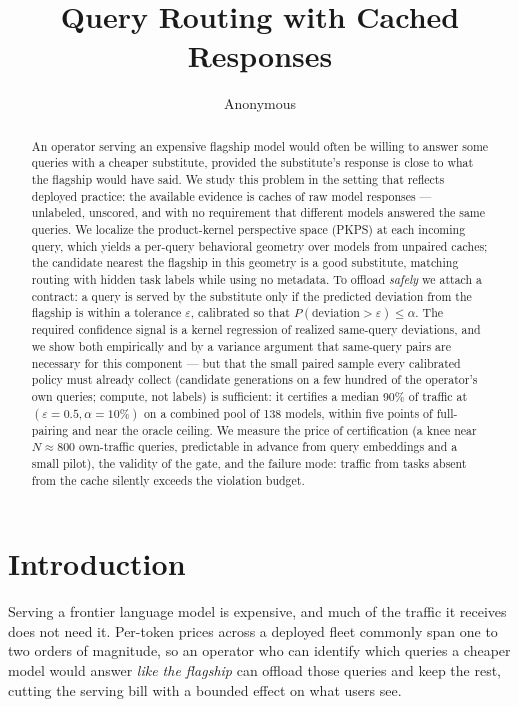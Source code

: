 \documentclass{article}
\title{Query Routing with Cached Responses}
\author{Anonymous}
\newcommand{\PKPS}{PKPS\xspace}
\newcommand{\eps}{\varepsilon}
\begin{document}
\maketitle

\begin{abstract}
An operator serving an expensive flagship model would often be willing to
answer some queries with a cheaper substitute, provided the substitute's
response is close to what the flagship would have said. We study this
problem in the setting that reflects deployed practice: the available
evidence is caches of raw model responses --- unlabeled, unscored, and with
no requirement that different models answered the same queries. We localize
the product-kernel perspective space (\PKPS) at each incoming query, which
yields a per-query behavioral geometry over models from unpaired caches;
the candidate nearest the flagship in this geometry is a good substitute,
matching routing with hidden task labels while using no metadata. To
offload \emph{safely} we attach a contract: a query is served by the
substitute only if the predicted deviation from the flagship is within a
tolerance $\eps$, calibrated so that
$P(\text{deviation} > \eps) \le \alpha$. The required confidence signal is
a kernel regression of realized same-query deviations, and we show both
empirically and by a variance argument that same-query pairs are necessary
for this component --- but that the small paired sample every calibrated
policy must already collect (candidate generations on a few hundred of the
operator's own queries; compute, not labels) is sufficient: it certifies a
median 90\% of traffic at $(\eps{=}0.5, \alpha{=}10\%)$ on a combined pool
of 138 models, within five points of full-pairing and near the oracle
ceiling. We measure the price of certification (a knee near $N \approx 800$
own-traffic queries, predictable in advance from query embeddings and a
small pilot), the validity of the gate, and the failure mode: traffic from
tasks absent from the cache silently exceeds the violation budget.
\end{abstract}

\section{Introduction}

Serving a frontier language model is expensive, and much of the traffic it
receives does not need it. Per-token prices across a deployed fleet
commonly span one to two orders of magnitude, so an operator who can
identify which queries a cheaper model would answer \emph{like the
flagship} can offload those queries and keep the rest, cutting the serving
bill with a bounded effect on what users see.
\end{document}
